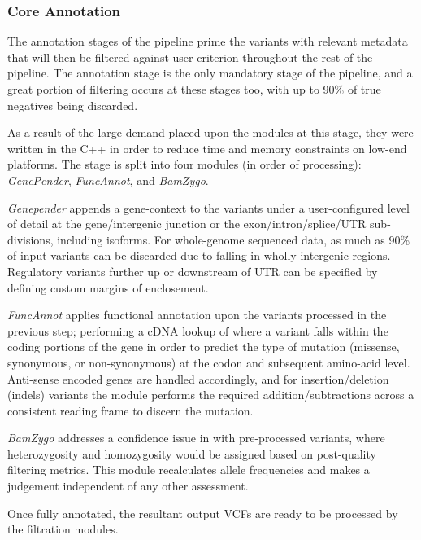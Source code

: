 
\subsubsection{Core Annotation}

The annotation stages of the pipeline prime the variants with relevant metadata that will then be filtered against user-criterion throughout the rest of the pipeline. The annotation stage is the only mandatory stage of the pipeline, and a great portion of filtering occurs at these stages too, with up to 90\% of  true negatives being discarded.

As a result of the large demand placed upon the modules at this stage, they were written in the C++ in order to reduce time and memory constraints on low-end platforms. The stage is split into four modules (in order of processing): \textit{GenePender}, \textit{FuncAnnot}, and \textit{BamZygo}.

\textit{Genepender} appends a gene-context to the variants under a user-configured level of detail at the gene/intergenic junction or the exon/intron/splice/UTR sub-divisions, including isoforms. For whole-genome sequenced data, as much as 90\% of input variants can be discarded due to falling in wholly intergenic regions. Regulatory variants further up or downstream of UTR can be specified by defining custom margins of enclosement.



\textit{FuncAnnot} applies functional annotation upon the variants processed in the previous step; performing a cDNA lookup of where a variant falls within the coding portions of the gene in order to predict the type of mutation (missense, synonymous, or non-synonymous) at the codon and subsequent amino-acid level. Anti-sense encoded genes are handled accordingly, and for insertion/deletion (indels) variants the module performs the required addition/subtractions across a consistent reading frame to discern the mutation.

\textit{BamZygo} addresses a confidence issue in with pre-processed variants, where heterozygosity and homozygosity would be assigned based on post-quality filtering metrics. This module recalculates allele frequencies and makes a judgement independent of any other assessment.

Once fully annotated, the resultant output VCFs are ready to be processed by the filtration modules.

